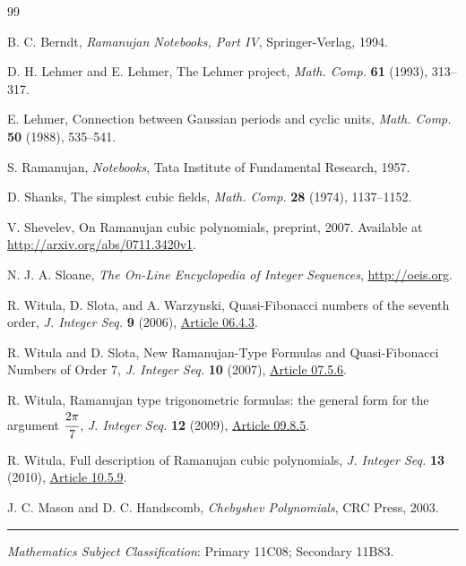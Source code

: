\documentclass[12pt,reqno]{article}
\begin{document}
\begin{thebibliography}{99}

 B. C. Berndt, \emph{Ramanujan Notebooks, Part IV}, Springer-Verlag, 1994.

 D. H. Lehmer and E. Lehmer, The Lehmer project,
\emph{Math. Comp.} \textbf{61} (1993), 313--317.

 E. Lehmer, Connection between Gaussian periods and cyclic units,
\emph{Math. Comp.} \textbf{50} (1988), 535--541. 

 S. Ramanujan, \emph{Notebooks}, Tata Institute of
Fundamental Research, 1957.

 D. Shanks, The simplest cubic fields, \emph{Math. 
Comp.} \textbf{28} (1974), 1137--1152.

 V. Shevelev, On Ramanujan cubic polynomials, preprint,
2007.  Available at 
\url{http://arxiv.org/abs/0711.3420v1}.

 N. J. A. Sloane, \emph{The On-Line Encyclopedia of
Integer Sequences}, \url{http://oeis.org}.

 R. Witula, D. Slota, and A. Warzynski, Quasi-Fibonacci
numbers of the seventh order, \emph{J. Integer Seq.} \textbf{9}
(2006),
\href{https://cs.uwaterloo.ca/journals/JIS/VOL9/Slota/slota57.html}{Article
06.4.3}.

 R. Witula and D. Slota, New Ramanujan-Type Formulas
and Quasi-Fibonacci Numbers of Order 7, \emph{J. Integer Seq.}
\textbf{10} (2007),
\href{https://cs.uwaterloo.ca/journals/JIS/VOL10/Slota/witula13.html}{Article
07.5.6}.

 R. Witula, Ramanujan type trigonometric formulas: the
general form for the argument $\cfrac{2\pi}{7}$, \emph{J. Integer Seq.}
\textbf{12} (2009),
\href{https://cs.uwaterloo.ca/journals/JIS/VOL12/Witula/witula17.html}{Article
09.8.5}.

 R. Witula, Full description of Ramanujan cubic
polynomials, \emph{J. Integer Seq.} \textbf{13} (2010),
\href{https://cs.uwaterloo.ca/journals/JIS/VOL13/Witula/witula30.pdf}{Article
10.5.9}.

 J. C. Mason and D. C. Handscomb, \emph{Chebyshev
Polynomials}, CRC Press, 2003.
\end{thebibliography}


\bigskip
\hrule
\bigskip

 {\it Mathematics Subject Classification}:
Primary 11C08; Secondary 11B83.
\end{document}
